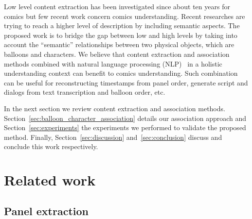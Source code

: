\documentclass[conference]{IEEEtran}
\begin{document}
Low level content extraction has been investigated since about ten years for comics but few recent work concern comics understanding.
Recent researches are trying to reach a higher level of description by including semantic aspects.
The proposed work is to bridge the gap between low and high levels by taking into account the ``semantic'' relationships between two physical objects, which are balloons and characters.
We believe that content extraction and association methods combined with natural language processing (NLP)~\cite{Yusra2014Unsupervised} in a holistic understanding context can benefit to comics understanding.
Such combination can be useful for reconstructing timestamps from panel order, generate script and dialogs from text transcription and balloon order, etc.

In the next section we review content extraction and association methods.
Section~\ref{sec:balloon_character_association} details our association approach and Section~\ref{sec:experiments} the experiments we performed to validate the proposed method.
Finally, Section~\ref{sec:discussion} and~\ref{sec:conclusion} discuss and conclude this work respectively.

\section{Related work}
\label{sec:related_work}

  \subsection{Panel extraction} %
  \label{sub:panel_extraction}
\end{document}
